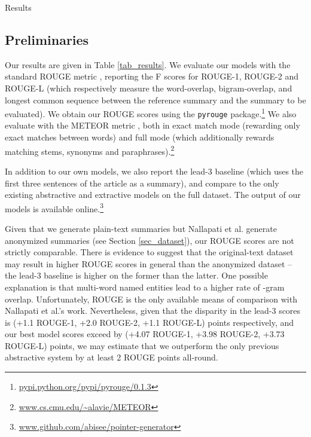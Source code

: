 \documentclass[11pt,a4paper]{article}
\begin{document}
\begin{section}{Results}
\label{sec_results}
\subsection{Preliminaries}
Our results are given in Table \ref{tab_results}.
We evaluate our models with the standard ROUGE metric \cite{lin2004rouge}, reporting the F scores for ROUGE-1, ROUGE-2 and ROUGE-L (which respectively measure the word-overlap, bigram-overlap, and longest common sequence between the reference summary and the summary to be evaluated).
We obtain our ROUGE scores using the \texttt{pyrouge} package.\footnote{\url{pypi.python.org/pypi/pyrouge/0.1.3}}
We also evaluate with the METEOR metric \cite{denkowski:lavie:meteor-wmt:2014}, both in exact match mode (rewarding only exact matches between words) and full mode (which additionally rewards matching stems, synonyms and paraphrases).\footnote{\url{www.cs.cmu.edu/~alavie/METEOR}}

In addition to our own models, we also report the lead-3 baseline (which uses the first three
sentences of the article as a summary), and compare to the only existing
abstractive \cite{nallapati2016abstractive} and extractive \cite{nallapati2016summarunner} models on the full dataset.
The output of our models is available online.\footnote{\url{www.github.com/abisee/pointer-generator}}

Given that we generate plain-text summaries but Nallapati et
al. 
generate anonymized summaries (see Section \ref{sec_dataset}), our ROUGE scores are not strictly comparable.
There is evidence to suggest that the original-text dataset may result in higher ROUGE scores in general than the anonymized dataset -- the lead-3 baseline is higher on the former than the latter.
One possible explanation is that multi-word named entities lead to a higher rate of -gram overlap.
Unfortunately, ROUGE is the only available means of comparison with Nallapati et al.'s work.
Nevertheless, given that the disparity in the lead-3 scores is (+1.1 ROUGE-1, +2.0 ROUGE-2, +1.1 ROUGE-L) points respectively, and our best model scores exceed \citeauthor{nallapati2016abstractive}  by (+4.07 ROUGE-1, +3.98 ROUGE-2, +3.73 ROUGE-L) points, we may estimate that we outperform the only previous abstractive system by at least 2 ROUGE points all-round.

\begin{figure}[t]
\centering



\end{figure}
\end{section}
\end{document}
